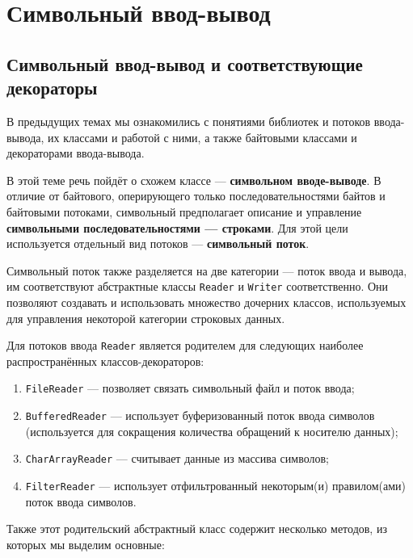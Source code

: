 \documentclass{report}
\begin{document}
\newpage
\chapter{Символьный ввод-вывод}

\section{Символьный ввод-вывод и соответствующие декораторы}

В предыдущих темах мы ознакомились с понятиями библиотек и потоков ввода-вывода, их классами и работой с ними, а также байтовыми классами и декораторами ввода-вывода.

В этой теме речь пойдёт о схожем классе — \textbf{символьном вводе-выводе}. В отличие от байтового, оперирующего только последовательностями байтов и байтовыми потоками, символьный предполагает описание и управление \textbf{символьными последовательностями — строками}. Для этой цели используется отдельный вид потоков — \textbf{символьный поток}.

Символьный поток также разделяется на две категории — поток ввода и вывода, им соответствуют абстрактные классы \verb|Reader| и \verb|Writer| соответственно. Они позволяют создавать и использовать множество дочерних классов, используемых для управления некоторой категории строковых данных.

Для потоков ввода \verb|Reader| является родителем для следующих наиболее распространённых классов-декораторов:

\begin{enumerate}
    \item \verb|FileReader| — позволяет связать символьный файл и поток ввода;
    \item \verb|BufferedReader| — использует буферизованный поток ввода символов (используется для сокращения количества обращений к носителю данных);
    \item \verb|CharArrayReader| — считывает данные из массива символов;
    \item \verb|FilterReader| — использует отфильтрованный некоторым(и) правилом(ами) поток ввода символов.
\end{enumerate}

Также этот родительский абстрактный класс содержит несколько методов, из которых мы выделим основные:
\end{document}
